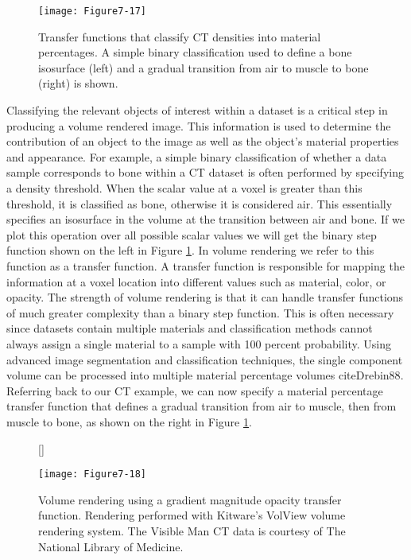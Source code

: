 \begin{figure}[!htb]
	\texttt{[image: Figure7-17]}
	\caption{Transfer functions that classify CT densities into material percentages. A simple binary classification used to define a bone isosurface (left) and a gradual transition from air to muscle to bone (right) is shown.}\label{fig:Figure7-17}
\end{figure}

Classifying the relevant objects of interest within a dataset is a critical step in producing a volume rendered image. This information is used to determine the contribution of an object to the image as well as the object's material properties and appearance. For example, a simple binary classification of whether a data sample corresponds to bone within a CT dataset is often performed by specifying a density threshold. When the scalar value at a voxel is greater than this threshold, it is classified as bone, otherwise it is considered air. This essentially specifies an isosurface in the volume at the transition between air and bone. If we plot this operation over all possible scalar values we will get the binary step function shown on the left in Figure \ref{fig:Figure7-17}. In volume rendering we refer to this function as a transfer function. A transfer function is responsible for mapping the information at a voxel location into different values such as material, color, or opacity. The strength of volume rendering is that it can handle transfer functions of much greater complexity than a binary step function. This is often necessary since datasets contain multiple materials and classification methods cannot always assign a single material to a sample with 100 percent probability. Using advanced image segmentation and classification techniques, the single component volume can be processed into multiple material percentage volumes cite{Drebin88}. Referring back to our CT example, we can now specify a material percentage transfer function that defines a gradual transition from air to muscle, then from muscle to bone, as shown on the right in Figure \ref{fig:Figure7-17}.

\begin{figure}[!htb]
	[\FBwidth]
	{\caption{Volume rendering using a gradient magnitude opacity transfer function. Rendering performed with Kitware's VolView volume rendering system. The Visible Man CT data is courtesy of The National Library of Medicine.}\label{fig:Figure7-18}}
	{\texttt{[image: Figure7-18]}}
\end{figure}

